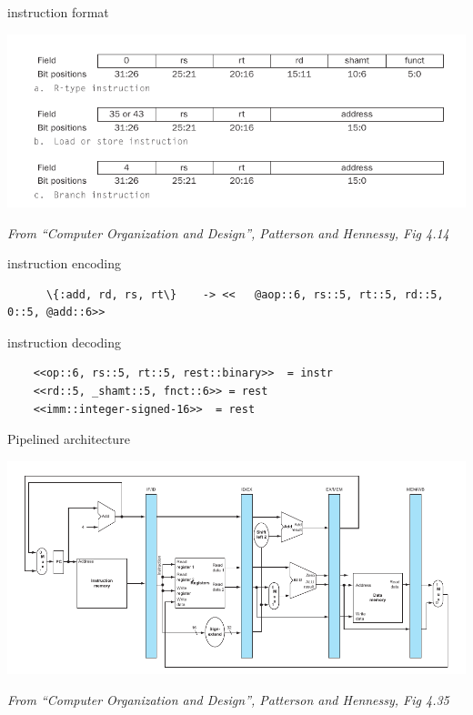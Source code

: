 \begin{frame}{instruction format}

\includegraphics[scale=0.6]{rtype.png}  

\vspace{20pt}
{\em From ``Computer Organization and Design'', Patterson and Hennessy, Fig 4.14}
\end{frame}

\begin{frame}[fragile]{instruction encoding}

 \begin{lstlisting}
      \{:add, rd, rs, rt\}    -> <<   @aop::6, rs::5, rt::5, rd::5, 0::5, @add::6>>
 \end{lstlisting}

\end{frame}

\begin{frame}[fragile]{instruction decoding}

 \begin{lstlisting}
	<<op::6, rs::5, rt::5, rest::binary>>  = instr
	<<rd::5, _shamt::5, fnct::6>> = rest
	<<imm::integer-signed-16>>  = rest
  \end{lstlisting}
\end{frame}

\begin{frame}{Pipelined architecture}
 
\includegraphics[scale=0.5]{pipeline.png}  

\vspace{20pt}
{\em From ``Computer Organization and Design'', Patterson and Hennessy, Fig 4.35}
\end{frame}






